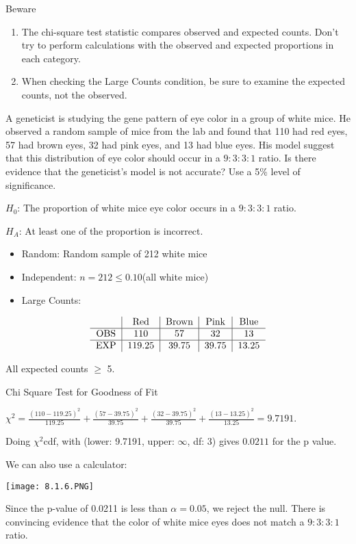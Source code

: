 \documentclass[../stats.tex]{subfiles}
\begin{document}
Beware
\begin{enumerate}
    \item The chi-square test statistic compares observed and expected counts. Don't try to perform calculations with the observed and expected proportions in each category.
    \item When checking the Large Counts condition, be sure to examine the expected counts, not the observed.
\end{enumerate}
\begin{example}
    A geneticist is studying the gene pattern of eye color in a group of white mice. He observed a random sample of mice from the lab and found that 110 had red eyes, 57 had brown eyes, 32 had pink eyes, and 13 had blue eyes. His model suggest that this distribution of eye color should occur in a $9:3:3:1$ ratio. Is there evidence that the geneticist's model is not accurate? Use a 5\% level of significance.

    $H_0$: The proportion of white mice eye color occurs in a $9:3:3:1$ ratio.

    $H_A$: At least one of the proportion is incorrect.

    \begin{itemize}
        \item Random: Random sample of 212 white mice 
        \item Independent: $n=212\leq 0.10$(all white mice)
        \item Large Counts:
    \end{itemize}\medbreak
    \[ \begin{tabular}{c|c|c|c|c}
        & Red & Brown & Pink & Blue \\ \hline 
        OBS & 110 & 57 & 32 & 13\\\hline 
        EXP & 119.25 & 39.75 & 39.75 & 13.25
    \end{tabular}\]

    All expected counts $\geq$ 5.

    Chi Square Test for Goodness of Fit 

    $\chi^2 = \frac{(110-119.25)^2}{119.25}+\frac{(57-39.75)^2}{39.75}+\frac{(32-39.75)^2}{39.75}+\frac{(13-13.25)^2}{13.25}=9.7191$.

    Doing $\chi^2$cdf, with (lower: 9.7191, upper: $\infty$, df: 3) gives $0.0211$ for the p value.

    We can also use a calculator:
    \begin{center}
        \texttt{[image: 8.1.6.PNG]}
    \end{center}

    Since the p-value of 0.0211 is less than $\alpha=0.05$, we reject the null. There is convincing evidence that the color of white mice eyes does not match a $9:3:3:1$ ratio.
\end{example}
\end{document}

